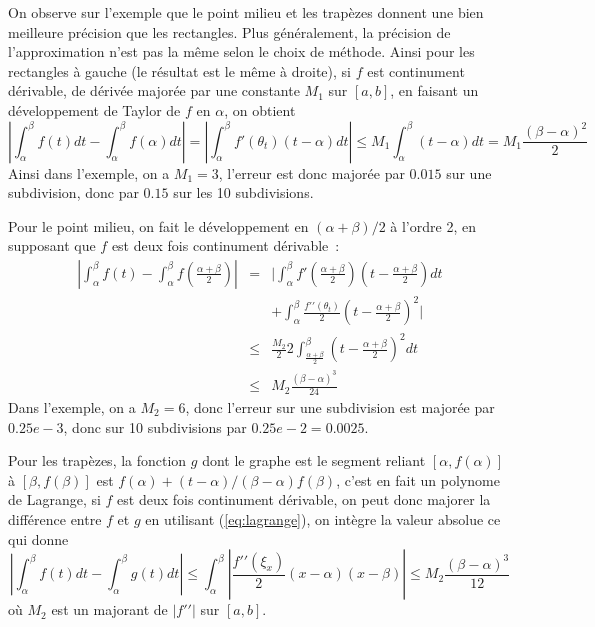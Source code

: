 \documentclass[a4paper,11pt]{article}
\begin{document}
\begin{giacjshere}
On observe sur l'exemple que le point milieu et les trapèzes donnent
une bien meilleure précision que les rectangles. Plus généralement,
la précision de l'approximation n'est pas la même selon le choix
de méthode.
Ainsi pour les rectangles à gauche (le résultat est le même
à droite), si $f$ est continument dérivable, de dérivée majorée
par une constante $M_1$ sur $[a,b]$, en faisant un
développement de Taylor de $f$ en $\alpha$, on obtient
\[ |\int_{\alpha}^{\beta} f(t) dt - \int_{\alpha}^{\beta} f(\alpha) dt |
= | \int_{\alpha}^{\beta} f'(\theta_t)(t-\alpha) dt |
\leq M_1 \int_{\alpha}^{\beta} (t-\alpha) dt = M_1\frac{(\beta-\alpha)^2}{2}
\]
Ainsi dans l'exemple, on a $M_1=3$, l'erreur est donc majorée par $0.015$
sur une subdivision, donc par $0.15$ sur les 10 subdivisions.

Pour le point milieu, on fait le développement en $(\alpha+\beta)/2$ à l'ordre
2, en supposant que $f$ est deux fois continument dérivable~:
\begin{eqnarray*}
 |\int_{\alpha}^{\beta} f(t)  - \int_{\alpha}^{\beta} f(\frac{\alpha+\beta}{2})  |
&= &| \int_{\alpha}^{\beta} f'(\frac{\alpha+\beta}{2})(t-\frac{\alpha+\beta}{2}) dt
\\
& &
+  \int_{\alpha}^{\beta} \frac{f'{'}(\theta_t)}{2}(t-\frac{\alpha+\beta}{2})^2 |
\\
&\leq & \frac{M_2}{2} 2 \int_{\frac{\alpha+\beta}{2}}^{\beta}
(t-\frac{\alpha+\beta}{2})^2 dt  \\
& \leq & M_2\frac{(\beta-\alpha)^3}{24}
\end{eqnarray*}
Dans l'exemple, on a $M_2=6$, donc l'erreur sur une subdivision est
majorée par $0.25e-3$, donc sur 10 subdivisions par $0.25e-2=0.0025$.

Pour les trapèzes, la fonction $g$ dont le graphe est le segment reliant
$[\alpha,f(\alpha)]$ à $[\beta,f(\beta)]$ est $f(\alpha)+(t-\alpha)/(\beta-\alpha)f(\beta)$,
c'est en fait un polynome de Lagrange, si $f$ est deux fois continument
dérivable, on peut donc majorer la différence
entre $f$ et $g$ en utilisant (\ref{eq:lagrange}), on intègre la valeur
absolue ce qui donne
\[ |\int_{\alpha}^{\beta} f(t) dt - \int_{\alpha}^{\beta} g(t) dt |
\leq \int_{\alpha}^{\beta} |\frac{f'{'}(\xi_x)}{2} (x-\alpha)(x-\beta)|
\leq M_2 \frac{(\beta-\alpha)^3}{12} \]
où $M_2$ est un majorant de $|f'{'}|$ sur $[a,b]$.


\end{giacjshere}
\end{document}

